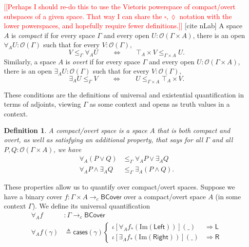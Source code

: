 \documentclass[conference]{IEEEtran}
\newtheorem{definition}{Definition}
\newcommand{\cto}{\to_c}
\newcommand{\Open}[1]{\mathcal{O}({#1})}
\newcommand{\wildcard}{\_}
\newcommand{\Img}[1]{\text{Im}\left({#1}\right)}
\newcommand{\oinclf}[1]{\iota[{#1}]}
\newcommand{\oincl}[2]{\oinclf{#1} \left({#2}\right)}
\newcommand{\Branch}{\Rightarrow}
\newcommand{\note}[1]{\textcolor{red}{[[{#1}]]}}
\begin{document}
\note{Perhaps I should re-do this to use the Vietoris powerspace of compact/overt subspaces of a given space. That way I can share the $\square, \lozenge$ notation with the lower powerspaces, and hopefully require fewer definitions.}
[cite nLab]
A space $A$ is \emph{compact} if for every space $\Gamma$ and every open $U : \Open{\Gamma \times A}$, there is an open $\forall_A U : \Open{\Gamma}$ such that for every $V : \Open{\Gamma},$
\[
V \le_\Gamma \forall_A U \qquad \Leftrightarrow \qquad \top_A \times V \le_{\Gamma \times A} U.
\]
Similarly, a space $A$ is \emph{overt} if for every space $\Gamma$ and every open $U : \Open{\Gamma \times A}$, there is an open $\exists_A U : \Open{\Gamma}$ such that for every $V : \Open{\Gamma},$
\[
\exists_A U \le_\Gamma V  \qquad \Leftrightarrow \qquad U  \le_{\Gamma \times A} \top_A \times V.
\]

These conditions are the definitions of universal and existential quantification in terms of adjoints, viewing $\Gamma$ as some context and opens as truth values in a context.

\begin{definition}
A \emph{compact/overt} space is a space $A$ that is both compact and overt, as well as satisfying an additional property, that says for all $\Gamma$ and all $P, Q : \Open{\Gamma \times A}$, we have
\begin{align*}
\forall_A(P \vee Q) &\le_\Gamma \forall_A P \vee \exists_A Q
\\  \forall_A P \wedge \exists_A Q &\le_\Gamma \exists_A (P \wedge Q).
\end{align*}
\end{definition}
These properties allow us to quantify over compact/overt spaces. Suppose we have a binary cover $f : \Gamma \times A \cto \mathsf{BCover}$ over a compact/overt space $A$ (in some context $\Gamma$). We define its universal quantification
\begin{align*}
\forall_A f &: \Gamma \cto \mathsf{BCover}
\\ \forall_A f(\gamma) &\triangleq \mathsf{cases}(\mathsf{\gamma})
\begin{cases}
\oincl{\forall_A f_*(\Img{\mathsf{Left}})}{\wildcard} &\Branch \mathsf{L}
\\ \oincl{\exists_A f_*(\Img{\mathsf{Right}})}{\wildcard} &\Branch \mathsf{R}
\end{cases}
\end{align*}
\end{document}
